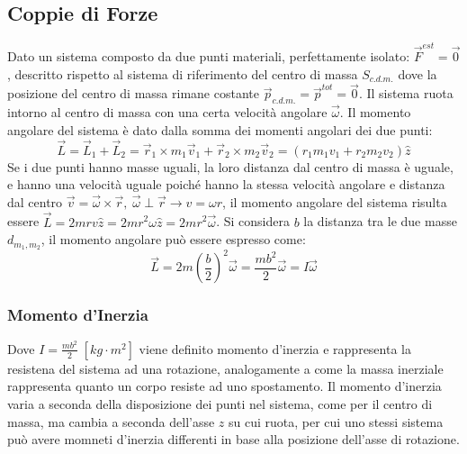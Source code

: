 \documentclass{article}
\numberwithin{equation}{subsection}
\begin{document}
\subsection{Coppie di Forze}

Dato un sistema composto da due punti materiali, perfettamente 
isolato: $\vec{F}^{est}=\vec{0}$, descritto rispetto al sistema di riferimento del centro di massa $S_{c.d.m.}$ 
dove la posizione del centro 
di massa rimane costante $\vec{p}_{c.d.m.}=\vec{p}^{tot}=\vec{0}$. 
Il sistema ruota intorno al centro di massa con una certa 
velocità angolare $\vec{\omega}$. Il momento angolare del sistema 
è dato dalla somma dei momenti angolari dei due punti: 
\begin{equation*}
    \vec{L}=\vec{L}_1+\vec{L}_2=\vec{r}_1\times m_1\vec{v}_1+\vec{r}_2\times m_2\vec{v}_2=(r_1m_1v_1+r_2m_2v_2)\hat{z}
\end{equation*}
Se i due punti hanno masse uguali, la loro distanza dal centro di 
massa è uguale, e hanno una velocità uguale poiché hanno la stessa 
velocità angolare e distanza dal centro $\vec{v}=\vec{\omega}\times\vec{r},\:\vec{\omega}\perp\vec{r}\rightarrow v=\omega r$, 
il momento angolare del sistema risulta essere $\vec{L}=2mrv\hat{z}=2mr^2\omega\hat{z}=2mr^2\vec{\omega}$. 
Si considera $b$ la distanza tra le due masse $d_{m_1,m_2}$, 
il momento angolare può essere espresso come:
\begin{equation}
    \vec{L}=\displaystyle 2m\left(\frac{b}{2}\right)^2\vec{\omega}=\frac{mb^2}{2}\vec{\omega}=I\vec{\omega}
\end{equation}

\subsubsection{Momento d'Inerzia}

Dove $I=\displaystyle\frac{mb^2}{2}\;\left[kg\cdot m^2\right]$ viene definito momento d'inerzia 
e rappresenta la resistena del sistema ad una rotazione, analogamente a come  
la massa inerziale rappresenta quanto un corpo resiste ad uno spostamento. Il momento d'inerzia varia a seconda della disposizione dei punti nel sistema, come per il centro 
di massa, ma cambia a seconda dell'asse $z$ su cui ruota, per cui uno stessi sistema può avere momneti d'inerzia differenti in base alla posizione dell'asse di rotazione. 
\end{document}
